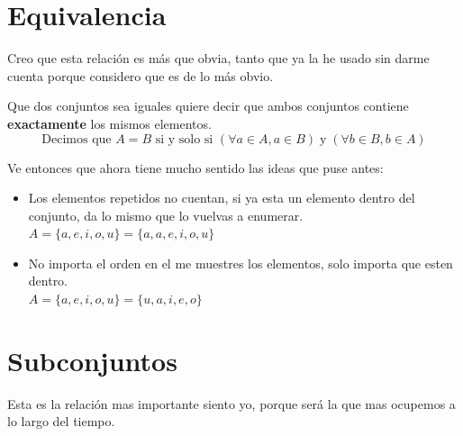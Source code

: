\documentclass[12pt, fleqn]{report}                             %
\theoremstyle{break}                                            %
\begin{document}
        \section{Equivalencia}

            Creo que esta relación es más que obvia, tanto que ya la he usado sin darme cuenta
            porque considero que es de lo más obvio.

            Que dos conjuntos sea iguales quiere decir que ambos conjuntos contiene
            \textbf{exactamente} los mismos elementos.
            \begin{equation*}
                \text{Decimos que }
                A = B 
                \text{ si y solo si }
                (\forall a \in A, a \in B) \;\text{y}\; (\forall b \in B, b \in A)
            \end{equation*}

            Ve entonces que ahora tiene mucho sentido las ideas que puse antes:

            \begin{itemize}
                \item Los elementos repetidos no cuentan, si ya esta un elemento dentro del
                    conjunto, da lo mismo que lo vuelvas a enumerar.\\
                    $A = \{a, e, i, o, u\} = \{a, a, e, i, o, u\}$

                \item No importa el orden en el me muestres los elementos,
                    solo importa que esten dentro.\\
                    $A = \{a, e, i, o, u\} = \{u, a, i, e, o\}$
            \end{itemize}


        \clearpage
        \section{Subconjuntos}

            Esta es la relación mas importante siento yo, porque será la que mas ocupemos a lo largo
            del tiempo.
\end{document}
